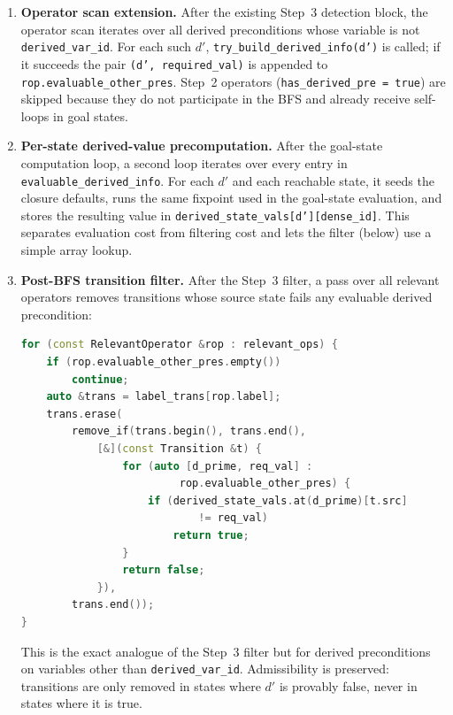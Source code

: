 \documentclass[11pt,a4paper]{article}
\begin{document}
\begin{itemize}
\begin{enumerate}
      \item \textbf{Operator scan extension.}
        After the existing Step~3 detection block, the operator scan
        iterates over all derived preconditions whose variable is not
        \texttt{derived\_var\_id}.  For each such $d'$,
        \texttt{try\_build\_derived\_info(d')} is called; if it succeeds the
        pair \texttt{(d', required\_val)} is appended to
        \texttt{rop.evaluable\_other\_pres}.  Step~2 operators
        (\texttt{has\_derived\_pre = true}) are skipped because they do not
        participate in the BFS and already receive self-loops in goal states.

      \item \textbf{Per-state derived-value precomputation.}
        After the goal-state computation loop, a second loop iterates over
        every entry in \texttt{evaluable\_derived\_info}.  For each $d'$ and
        each reachable state, it seeds the closure defaults, runs the same
        fixpoint used in the goal-state evaluation, and stores the resulting
        value in \texttt{derived\_state\_vals[d'][dense\_id]}.  This
        separates evaluation cost from filtering cost and lets the filter
        (below) use a simple array lookup.

      \item \textbf{Post-BFS transition filter.}
        After the Step~3 filter, a pass over all relevant operators removes
        transitions whose source state fails any evaluable derived
        precondition:
\begin{lstlisting}[language=C++]
for (const RelevantOperator &rop : relevant_ops) {
    if (rop.evaluable_other_pres.empty())
        continue;
    auto &trans = label_trans[rop.label];
    trans.erase(
        remove_if(trans.begin(), trans.end(),
            [&](const Transition &t) {
                for (auto [d_prime, req_val] :
                         rop.evaluable_other_pres) {
                    if (derived_state_vals.at(d_prime)[t.src]
                            != req_val)
                        return true;
                }
                return false;
            }),
        trans.end());
}
\end{lstlisting}
        This is the exact analogue of the Step~3 filter but for derived
        preconditions on variables other than \texttt{derived\_var\_id}.
        Admissibility is preserved: transitions are only removed in states
        where $d'$ is provably false, never in states where it is true.
    \end{enumerate}


\end{itemize}
\end{document}
